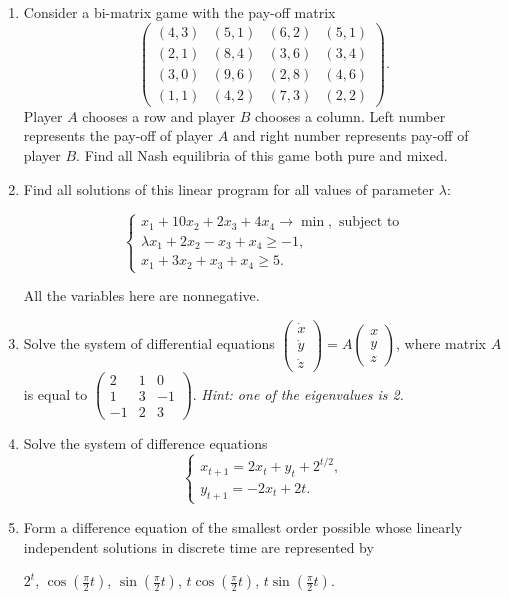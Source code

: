 \documentclass[12pt]{article} %
\theoremstyle{definition} %
\begin{document}
\begin{enumerate}
\item Consider a bi-matrix game with the pay-off matrix
\[
\begin{pmatrix}
(4,3) & (5,1) & (6,2) & (5,1)\\
(2,1) & (8,4) & (3,6) & (3,4)\\
(3,0) & (9,6) & (2,8) &(4,6)\\
(1,1) & (4,2) & (7,3) & (2,2)
\end{pmatrix}. 
\]
Player $A$ chooses a row and player $B$ chooses a column. 
Left number represents the pay-off of player $A$ and right number represents pay-off of player $B$. 
Find all Nash equilibria of this game both pure and mixed.

\item Find all solutions of this linear program for all values of parameter $\lambda$:

\[
\begin{cases}
x_1+10x_2+2x_3+4x_4\rightarrow \min,\text{ subject to}\\
\lambda x_1+2x_2-x_3+x_4\geqslant -1,\\
x_1+3x_2+x_3+x_4\geqslant 5.
\end{cases}
\]

All the variables here are nonnegative.

\item Solve the system of differential equations 
$\begin{pmatrix}\dot x\\ \dot y \\ \dot z\end{pmatrix}=A\begin{pmatrix} x\\ y \\  z\end{pmatrix}$, 
where matrix $A$  is  equal to $\begin{pmatrix}2 &1 &0\\ 1 &3 &-1 \\ -1 & 2& 3\end{pmatrix}$. \textit{Hint: one of the eigenvalues is 2.}

\item Solve the system of difference equations 
\[
\begin{cases}x_{t+1}=2x_t+y_t+2^{t/2},\\ y_{t+1}=-2x_t+2t.\end{cases}
\]

\item Form a difference equation of the smallest order possible whose linearly independent solutions in discrete time are represented by 
    
    \centerline{$2^t$, $\cos \left(\frac {\pi}2t\right)$, $\sin \left(\frac {\pi}2t\right)$, $t\cos\left(\frac {\pi}2t\right)$, $t\sin\left(\frac {\pi}2t\right)$.}
\end{enumerate}
\end{document}
